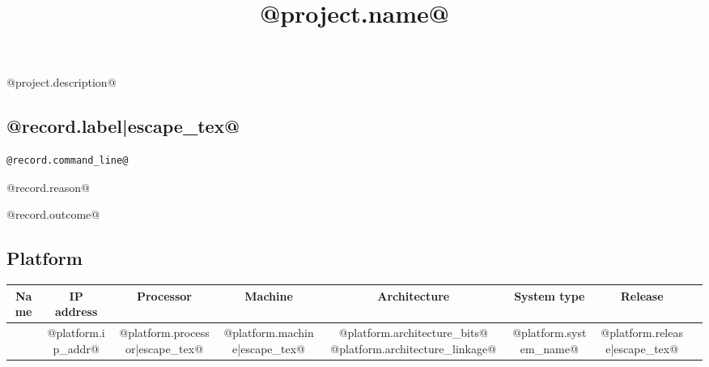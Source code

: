 \documentclass[@paper_size@, 10pt]{article}
\title{@project.name@}
\author{}
\date{}
\begin{document}
\maketitle

@project.description@

\tableofcontents

\newpage

{%

\begin{shaded}

\section{@record.label|escape_tex@}


\begin{lstlisting}
@record.command_line@
\end{lstlisting}




@record.reason@

@record.outcome@


\subsection{Platform}

\footnotesize
\begin{tabular}{cccccccc}
Name & IP address & Processor & Machine & Architecture & System type & Release \\ \hline
    {%
    @platform.network_name@ &
    @platform.ip_addr@ &
    @platform.processor|escape_tex@ &
    @platform.machine|escape_tex@ &
    @platform.architecture_bits@ @platform.architecture_linkage@ &
    @platform.system_name@ &
    @platform.release|escape_tex@ &
    {%
\end{tabular}
\normalsize


\end{shaded}}
\end{document}
